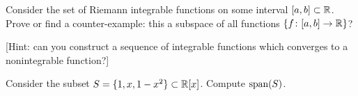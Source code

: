 \begin{exercise}
Consider the set of Riemann integrable functions on some interval
$[a,b]\subset\mathbb{R}$. Prove or find a counter-example: this a subspace of all functions $\{f\colon[a,b]\to\mathbb{R}\}$?

[Hint: can you construct a sequence of integrable functions which
  converges to a nonintegrable function?]
\end{exercise}

\begin{exercise}
Consider the subset $S = \{1,x,1-x^{2}\}\subset\mathbb{R}[x]$. Compute $\operatorname{span}(S)$.
\end{exercise}